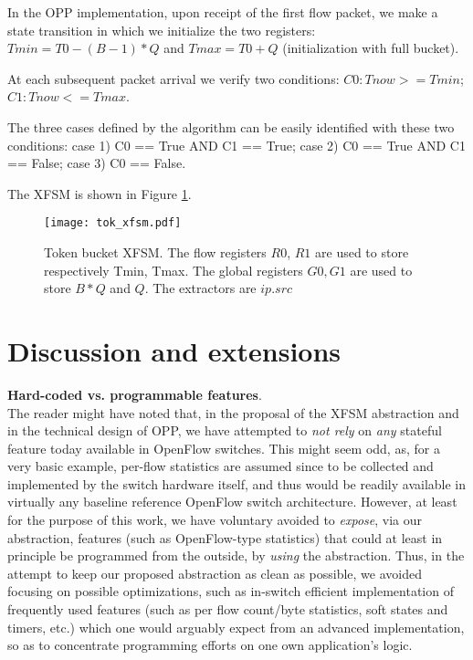 \documentclass{sig-alternate}
\begin{document}
In the OPP implementation, upon receipt of the first flow packet, we make a state transition in which we initialize the two registers: $Tmin=T0-(B-1)*Q$ and $Tmax=T0+Q$ (initialization with full bucket). 

At each subsequent packet arrival we verify two conditions: $C0: Tnow>=Tmin$; $C1: Tnow<=Tmax$.

The three cases defined by the algorithm can be easily identified with these two conditions: case 1) C0 == True AND C1 == True; case 2) C0 == True AND C1 == False; case 3) C0 == False.

The XFSM is shown in Figure \ref{fig:tok_xfsm}. 

\begin{figure}[t]
	\centering
	\texttt{[image: tok\_xfsm.pdf]} 
\vspace{-1.2em}
	\caption{Token bucket XFSM. The flow registers $R0$, $R1$ are used to store respectively Tmin, Tmax. The global registers $G0, G1$ are used to store $B*Q$ and $Q$. The extractors are $ip.src$}
	         	  \vspace{-1.5em}
	\label{fig:tok_xfsm}
\end{figure}



\section{Discussion and extensions}
\label{s:disc}

\noindent \textbf{Hard-coded vs. programmable features}. \\
The reader might have noted that, in the proposal of the XFSM abstraction and in the technical design of OPP, we have attempted to {\em not rely} on {\em any} stateful feature today available in OpenFlow switches. This might seem odd, as, for a very basic example, per-flow statistics are assumed since \cite{OF08} to be collected and implemented by the switch hardware itself, and thus would be readily available in virtually any baseline reference OpenFlow switch architecture. However, at least for the purpose of this work, we have voluntary avoided to {\em expose}, via our abstraction, features (such as OpenFlow-type statistics) that could at least in principle be programmed from the outside, by {\em using} the abstraction.  Thus, in the attempt to keep our proposed abstraction as clean as possible, we avoided focusing on possible optimizations, such as in-switch efficient implementation of frequently used features (such as per flow count/byte statistics, soft states and timers, etc.) which one would arguably expect from an advanced implementation, so as to concentrate programming efforts on one own application's logic. 
\end{document}
